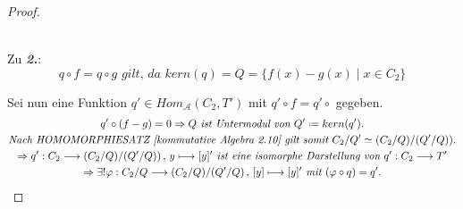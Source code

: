 \documentclass[10pt,a4paper]{report}
\newcommand{\functionfront}[3]{\nolinebreak{#1:#2 \longrightarrow #3}}
\newcommand{\function}[5]{\nolinebreak{#1:#2 \longrightarrow #3 \, , \, #4 \longmapsto #5}}
\newcommand{\colimes}[0]{\lim\limits_{ \longrightarrow }}
\newcommand*{\defeq}{\mathrel{\vcenter{\baselineskip0.5ex \lineskiplimit0pt
                     \hbox{\scriptsize.}\hbox{\scriptsize.}}}%
                     =}
\newcommand{\kernel}[1]{kern(#1)}
\begin{document}
\begin{proof}
\begin{center}
\end{center}
\ \\
Zu \textit{\textbf{2.}}:\
$$q \circ f = q \circ g \textit{ gilt, da } \kernel{q} = Q = \lbrace f(x) - g(x)\mid x \in C_2 \rbrace$$

Sei nun eine Funktion $q' \in Hom_{\mathcal{A}}(C_2,T')$ mit $q' \circ f = q' \circ$ gegeben.
\begin{gather*}
q' \circ (f - g) = 0 \Rightarrow Q\textit{ ist Untermodul von }Q' \defeq \kernel{q'}.\\
\textit{Nach HOMOMORPHIESATZ [kommutative Algebra 2.10] gilt somit } \nolinebreak{C_2/Q' \simeq (C_2/Q)/(Q'/Q))}.\\
\Rightarrow \function{q'}{C_2}{(C_2/Q)/(Q'/Q))}{y}{[y]'} \textit{ ist eine isomorphe Darstellung von } \functionfront{q'}{C_2}{T'}\\
\Rightarrow \exists ! \function{\varphi}{C_2/Q}{(C_2/Q)/(Q'/Q)}{[y]}{[y]'}\textit{ mit }(\varphi \circ q) = q'.
\end{gather*}
\end{proof}
\end{document}
